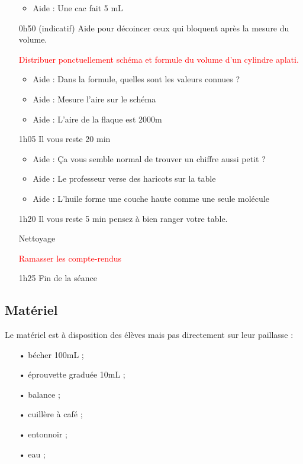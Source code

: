 \documentclass[12pt,a4paper]{article}
\begin{document}
\begin{itemize}
\begin{itemize}
\item Aide : Une cac fait 5 mL
\end{itemize}

\item[0h50] (indicatif)
Aide pour décoincer ceux qui bloquent après la mesure du volume.

\textcolor{red}{Distribuer ponctuellement schéma et formule du volume d'un cylindre aplati.}

\begin{itemize}
\item Aide : Dans la formule, quelles sont les valeurs connues ?
\item Aide : Mesure l'aire sur le schéma
\item Aide : L'aire de la flaque est \unit{2000}{m\squared}
\end{itemize}

\item[1h05]
\og Il vous reste 20 min \fg{}

\begin{itemize}
\item Aide : Ça vous semble normal de trouver un chiffre aussi petit ?
\item Aide : Le professeur verse des haricots sur la table
\item Aide : L'huile forme une couche haute comme une seule molécule
\end{itemize}

\item[1h20]
\og Il vous reste 5 min pensez à bien ranger votre table. \fg{} 

Nettoyage

\textcolor{red}{Ramasser les compte-rendus}
 
\item[1h25] Fin de la séance
\end{itemize}

\subsection{Matériel}

Le matériel est à disposition des élèves mais pas directement sur leur paillasse :
\begin{itemize}
\item[•] bécher \unit{100}{mL} ;
\item[•] éprouvette graduée \unit{10}{mL} ;
\item[•] balance ;
\item[•] cuillère à café ;
\item[•] entonnoir ;
\item[•] eau ;
\end{itemize}
\end{document}

